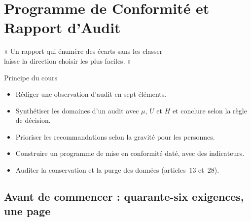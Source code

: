 
\chapter{Programme de Conformité et Rapport d'Audit}
\label{chap:programme}

\epigraph{%
    « Un rapport qui énumère des écarts sans les classer\\
    laisse la direction choisir les plus faciles. »%
}{Principe du cours}


\begin{boxobjectifs}
\begin{itemize}
    \item Rédiger une observation d'audit en sept éléments.
    \item Synthétiser les domaines d'un audit avec $\mu$, $U$ et $H$ et
          conclure selon la règle de décision.
    \item Prioriser les recommandations selon la gravité pour les
          personnes.
    \item Construire un programme de mise en conformité daté, avec des
          indicateurs.
    \item Auditer la conservation et la purge des données (articles~13
          et~28).
\end{itemize}
\end{boxobjectifs}

\bigskip

\section*{Avant de commencer : quarante-six exigences, une page}

